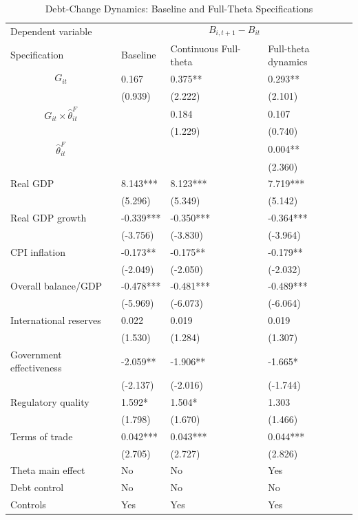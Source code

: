 \begin{table}[H]\centering
\begin{threeparttable}
\caption{Debt-Change Dynamics: Baseline and Full-Theta Specifications}
\label{tab:debt_change_combined_fulltheta}
\scriptsize
\begin{tabularx}{\textwidth}{lYYY}
\toprule
Dependent variable &  \\
\cmidrule(lr){2-4}
Specification & Baseline & Continuous Full-theta & Full-theta dynamics \\
\midrule
$$G_{it}$$ & 0.167 & 0.375** & 0.293** \\
 & (0.939) & (2.222) & (2.101) \\
$$G_{it}\times\widehat{\theta}^{F}_{it}$$ &  & 0.184 & 0.107 \\
 &  & (1.229) & (0.740) \\
$$\widehat{\theta}^{F}_{it}$$ &  &  & 0.004** \\
 &  &  & (2.360) \\
Real GDP & 8.143*** & 8.123*** & 7.719*** \\
 & (5.296) & (5.349) & (5.142) \\
Real GDP growth & -0.339*** & -0.350*** & -0.364*** \\
 & (-3.756) & (-3.830) & (-3.964) \\
CPI inflation & -0.173** & -0.175** & -0.179** \\
 & (-2.049) & (-2.050) & (-2.032) \\
Overall balance/GDP & -0.478*** & -0.481*** & -0.489*** \\
 & (-5.969) & (-6.073) & (-6.064) \\
International reserves & 0.022 & 0.019 & 0.019 \\
 & (1.530) & (1.284) & (1.307) \\
Government effectiveness & -2.059** & -1.906** & -1.665* \\
 & (-2.137) & (-2.016) & (-1.744) \\
Regulatory quality & 1.592* & 1.504* & 1.303 \\
 & (1.798) & (1.670) & (1.466) \\
Terms of trade & 0.042*** & 0.043*** & 0.044*** \\
 & (2.705) & (2.727) & (2.826) \\
\midrule
Theta main effect & No & No & Yes \\
Debt control & No & No & No \\
Controls & Yes & Yes & Yes \\

\end{tabularx}
\end{threeparttable}
\end{table}
